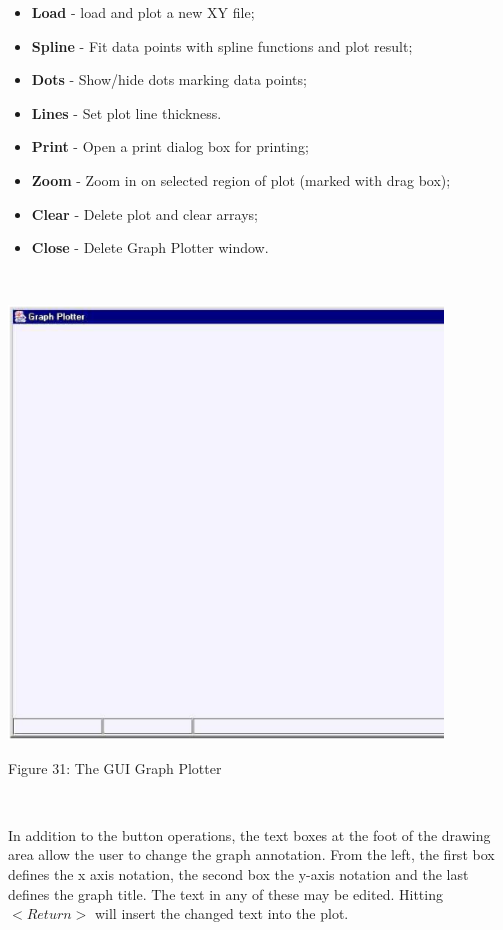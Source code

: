 \begin{itemize}
\item {\bf Load} - load and plot a new XY file;
\item {\bf Spline} - Fit data points with spline functions and plot result;
\item {\bf Dots} - Show/hide dots marking data points;
\item {\bf Lines} - Set plot line thickness.
\item {\bf Print} - Open a print dialog box for printing;
\item {\bf Zoom} - Zoom in on selected region of plot (marked with drag box);
\item {\bf Clear} - Delete plot and clear arrays;
\item {\bf Close} - Delete Graph Plotter window.
\end{itemize}

~

\begin{center}
\centerline{\includegraphics[height=11.5cm]{plot.ps}}
\centerline{Figure 31: The GUI Graph Plotter}
\end{center}

~

\noindent
In addition to the button operations, the text boxes at the foot of
the drawing area allow the user to change the graph annotation. From
the left, the first box defines the x axis notation, the second
box the y-axis notation and the last defines the graph title. The text
in any of these may be edited. Hitting $<Return>$ will insert the
changed text into the plot.

